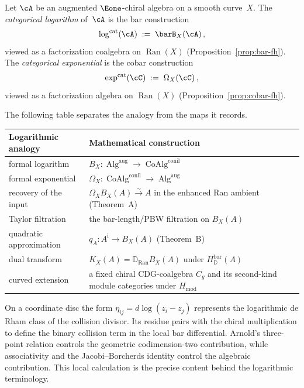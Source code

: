 \begin{definition}
\label{def:categorical-log-exp}
Let $\cA$ be an augmented $\Eone$-chiral algebra on a smooth
curve~$X$. The \emph{categorical logarithm} of~$\cA$ is the bar
construction
\[
\log^{\mathrm{cat}}(\cA) \;:=\; \barB_X(\cA)\,,
\]
viewed as a factorization coalgebra on $\operatorname{Ran}(X)$
(Proposition~\ref{prop:bar-fh}). The \emph{categorical exponential}
is the cobar construction
\[
\exp^{\mathrm{cat}}(\cC) \;:=\; \Omega_X(\cC)\,,
\]
viewed as a factorization algebra on $\operatorname{Ran}(X)$
(Proposition~\ref{prop:cobar-fh}).
\end{definition}

The following table separates the analogy from the maps it records.

\begin{center}
\small
\renewcommand{\arraystretch}{1.3}
\begin{tabular}{p{5.5cm}p{5.5cm}}
\textbf{Logarithmic analogy} & \textbf{Mathematical construction} \\
\hline
formal logarithm &
$B_X\colon\operatorname{Alg}^{\mathrm{aug}}\to
\operatorname{CoAlg}^{\mathrm{conil}}$ \\[2pt]
formal exponential &
$\Omega_X\colon\operatorname{CoAlg}^{\mathrm{conil}}\to
\operatorname{Alg}^{\mathrm{aug}}$ \\[2pt]
recovery of the input &
$\Omega_XB_X(A)\xrightarrow{\sim}A$ in the enhanced Ran ambient
(Theorem~A) \\[2pt]
Taylor filtration &
the bar-length/PBW filtration on $B_X(A)$ \\[2pt]
quadratic approximation &
$q_A\colon A^{\mathrm i}\to B_X(A)$
(Theorem~B) \\[2pt]
dual transform &
$K_X(A)=\mathbb D_{\operatorname{Ran}}B_X(A)$ under
$H_{\mathbb D}^{\mathrm{bar}}(A)$ \\[2pt]
curved extension &
a fixed chiral CDG-coalgebra $C_g$ and its second-kind module
categories under $H_{\mathrm{mod}}$
\end{tabular}
\end{center}

\begin{remark}
\label{rem:logarithmic-kernel}
On a coordinate disc the form
$\eta_{ij}=d\log(z_i-z_j)$ represents the logarithmic de Rham class
of the collision divisor.  Its residue pairs with the chiral
multiplication to define the binary collision term in the local bar
differential.  Arnold's three-point relation controls the geometric
codimension-two contribution, while associativity and the
Jacobi--Borcherds identity control the algebraic contribution.  This
local calculation is the precise content behind the logarithmic
terminology.
\end{remark}

